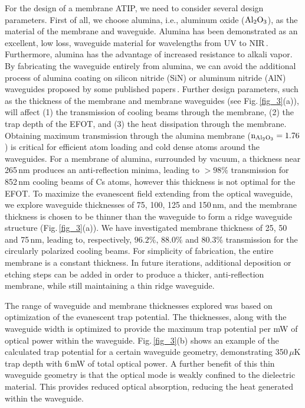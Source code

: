 \documentclass{osa-article}
\begin{document}
For the design of a membrane ATIP, we need to consider several design parameters. First of all, we choose alumina, i.e., aluminum oxide ($\rm{Al_{2}O_{3}}$), as the material of the membrane and waveguide. Alumina has been demonstrated as an excellent, low loss,  waveguide material for wavelengths from UV to NIR\,\cite{Aslan10, West19, Agaskar19}.  Furthermore, alumina has the advantage of increased resistance to alkali vapor. By fabricating the waveguide entirely from alumina, we can avoid the additional process of alumina coating on silicon nitride (SiN) or aluminum nitride (AlN) waveguides proposed by some published papers\,\cite{Pfau18}. Further design parameters, such as the thickness of the membrane and membrane waveguides (see Fig.\,\ref{fig_3}(a)), will affect (1) the transmission of cooling beams through the membrane, (2) the trap depth of the EFOT, and (3) the heat dissipation through the membrane. Obtaining maximum transmission through the alumina membrane ($\rm{n_{\rm{Al_{2}O_{3}}}=1.76}$) is critical for efficient atom loading and cold dense atoms around the waveguides. For a membrane of alumina, surrounded by vacuum, a thickness near 265\,nm produces an anti-reflection minima, leading to $> 98\%$ transmission for 852\,nm cooling beams of Cs atoms, however this thickness is not optimal for the EFOT. To maximize the evanescent field extending from the optical waveguide, we explore waveguide thicknesses of 75, 100, 125 and 150\,nm, and the membrane thickness is chosen to be thinner than the waveguide to form a ridge waveguide structure (Fig.\,\ref{fig_3}(a)).  We have investigated membrane thickness of 25, 50 and 75\,nm, leading to, respectively, $96.2\%$, $88.0\%$ and $80.3\%$ transmission for the circularly polarized cooling beams.  For simplicity of fabrication, the entire membrane is a constant thickness.  In future iterations, additional deposition or etching steps can be added in order to produce a thicker, anti-reflection membrane, while still maintaining a thin ridge waveguide.

The range of waveguide and membrane thicknesses explored was based on optimization of the evanescent trap potential.  The thicknesses, along with the waveguide width is optimized to provide the maximum trap potential per mW of optical power within the waveguide.  Fig.\,\ref{fig_3}(b) shows an example of the calculated trap potential for a certain waveguide geometry, demonstrating 350\,$\mu$K trap depth with 6\,mW of total optical power. A further benefit of this thin waveguide geometry is that the optical mode is weakly confined to the dielectric material. This provides reduced optical absorption, reducing the heat generated within the waveguide.
\end{document}
